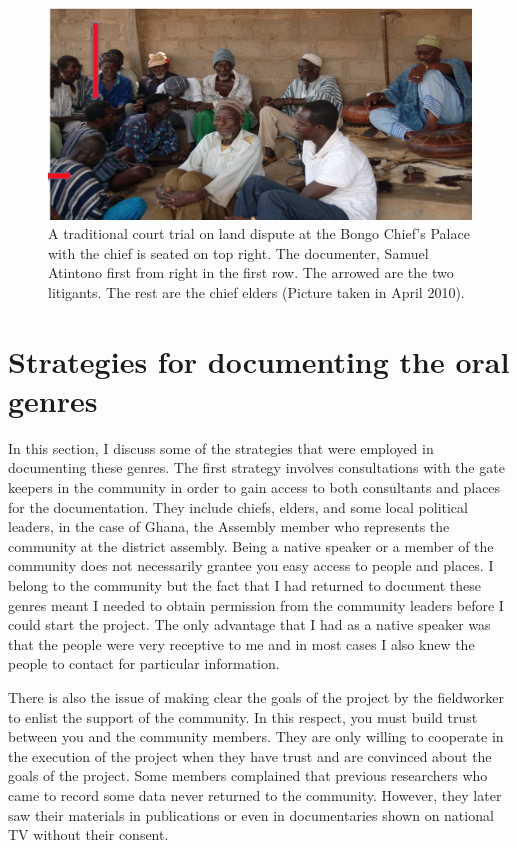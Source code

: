 \documentclass[output=paper,colorlinks,citecolor=brown]{langscibook}
\begin{document}
\begin{figure}
\includegraphics[width=\textwidth]{figures/bongo.png}
\caption{A traditional court trial on land dispute at the Bongo Chief’s Palace with the chief is seated 
 	on top right. The documenter, Samuel Atintono first from right in the first row. The arrowed are the 
 	two litigants. The rest are the chief elders (Picture taken in April 2010).}

\end{figure}


\section{Strategies for documenting the oral genres}

In this section, I discuss some of the strategies that were employed in documenting these genres. The first strategy involves consultations with the gate keepers in the community in order to gain access to both consultants and places for the documentation. They include chiefs, elders,  and some local political leaders,  in the case of Ghana, the Assembly member who represents the community at the district assembly. Being a native speaker or a member of the community does not necessarily grantee you easy access to people and places. I belong to the community but the fact that I had returned to document these genres meant I needed to obtain permission from the community leaders before I could start the project. The only advantage that I had as a native speaker was that the people were very receptive to me and in most cases I also knew the people to contact for particular information. 

There is also the issue of making clear the goals of the project by the fieldworker to enlist the support of the community. In this respect, you must build trust between you and the community members. They are only willing to cooperate in the execution of the project when they have trust and are convinced about the goals of the project. Some members complained that previous researchers who came to record some data never returned to the community. However, they later saw their materials in publications or even in documentaries shown on national TV without their consent.
\end{document}
